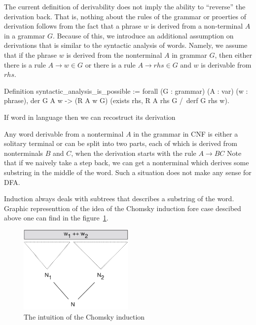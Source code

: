 The current definition of derivability does not imply the ability to ``reverse'' the derivation back. That is, nothing about the rules of the grammar or proerties of derivation follows from the fact that a phrase $w$ is derived from a non-terminal $A$ in a grammar $G$. Because of this, we introduce an additional assumption on derivations that is similar to the syntactic analysis of words.
Namely, we assume that if the phrase $w$ is derived from the nonterminal $A$ in grammar $G$, then either there is a rule $A \to w \in G$ or there is a rule $A \to rhs \in G$ and $w$ is derivable from $rhs$.

\begin{listing}[h]
    \begin{pyglist}[language=coq, numbers=none, numbersep=5pt]
Definition syntactic_analysis_is_possible :=
  forall (G : grammar) (A : var) (w : phrase),
  der G A w ->
   (R A w \in G) \/ 
   (exists rhs, R A rhs \in G /\ derf G rhs w).
  
  \end{pyglist}
    \caption{If word in language then we can recostruct its derivation}
    \label{lst:synt-analysis-is-possible}
\end{listing}

Any word derivable from a nonterminal $A$ in the grammar in CNF is either a solitary terminal or can be split into two parts, each of which is derived from nonterminals $B$ and $C$, when the derivation starts with the rule $A \to B C$
Note that if we naively take a step back, we can get a nonterminal which derives some substring in the middle of the word. 
Such a situation does not make any sense for DFA.

Induction always deals with subtrees that describes a substring of the word.
Graphic representtion of the idea of the Chomsky induction fore case descibed above one can find in the figure~\ref{fig:induction}.

\begin{figure}[htbp]
	\centering
	\includegraphics[width=0.5\textwidth]{ChomskyInductionIntuition}
	\caption{The intuition of the Chomsky induction}
	\label{fig:induction}
\end{figure}

